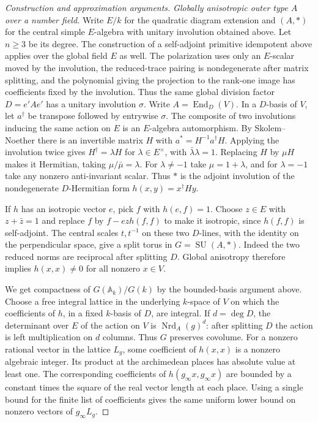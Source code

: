 \documentclass[11pt,a4paper,openany,oneside]{book}
\theoremstyle{resultstyle}
\theoremstyle{definition}
\numberwithin{equation}{chapter}
\begin{document}
\begin{proof}[Construction and approximation arguments]
\medskip\noindent
\textit{Globally anisotropic outer type \(A\) over a number field.}
Write \(E/k\) for the quadratic diagram extension and
\((A,\ast)\) for the central simple \(E\)-algebra with
unitary involution obtained above. Let \(n\geq3\) be its
degree. The construction of a self-adjoint primitive
idempotent above applies over the global field \(E\) as
well. The polarization uses only an \(E\)-scalar moved
by the involution, the reduced-trace pairing is
nondegenerate after matrix splitting, and the polynomial
giving the projection to the rank-one image has coefficients
fixed by the involution. Thus the same global division
factor \(D=e'Ae'\) has a unitary involution \(\sigma\).
Write \(A=\operatorname{End}_D(V)\). In a \(D\)-basis
of \(V\), let \(a^\dagger\) be transpose followed by
entrywise \(\sigma\). The composite of two involutions
inducing the same action on \(E\) is an \(E\)-algebra
automorphism. By Skolem--Noether there is an invertible
matrix \(H\) with \(a^\ast=H^{-1}a^\dagger H\).
Applying the involution twice gives \(H^\dagger=\lambda H\)
for \(\lambda\in E^\times\), with \(\bar\lambda\lambda=1\).
Replacing \(H\) by \(\mu H\) makes it Hermitian, taking
\(\mu/\bar\mu=\lambda\). For \(\lambda\ne-1\) take
\(\mu=1+\lambda\), and for \(\lambda=-1\) take any
nonzero anti-invariant scalar. Thus \(\ast\) is the
adjoint involution of the nondegenerate \(D\)-Hermitian
form \(h(x,y)=x^\dagger H y\).

If \(h\) has an isotropic vector \(e\), pick \(f\) with
\(h(e,f)=1\). Choose \(z\in E\) with \(z+\bar z=1\)
and replace \(f\) by \(f-e z h(f,f)\) to make it
isotropic, since \(h(f,f)\) is self-adjoint. The central
scales \(t,t^{-1}\) on these two \(D\)-lines, with the
identity on the perpendicular space, give a split torus
in \(G=\operatorname{SU}(A,\ast)\). Indeed the two
reduced norms are reciprocal after splitting \(D\).
Global anisotropy therefore implies \(h(x,x)\ne0\)
for all nonzero \(x\in V\).

We get compactness of \(G(\mathbb A_k)/G(k)\) by the
bounded-basis argument above. Choose a free integral
lattice in the underlying \(k\)-space of \(V\) on which
the coefficients of \(h\), in a fixed \(k\)-basis of
\(D\), are integral. If \(d=\deg D\), the determinant
over \(E\) of the action on \(V\) is
\(\operatorname{Nrd}_A(g)^d\): after splitting \(D\)
the action is left multiplication on \(d\) columns.
Thus \(G\) preserves covolume. For a nonzero rational
vector in the lattice \(L_g\), some coefficient of
\(h(x,x)\) is a nonzero algebraic integer. Its product
at the archimedean places has absolute value at least
one. The corresponding coefficients of
\(h(g_\infty x,g_\infty x)\) are bounded by a constant
times the square of the real vector length at each
place. Using a single bound for the finite list of
coefficients gives the same uniform lower bound on
nonzero vectors of \(g_\infty L_g\).


\end{proof}
\end{document}
